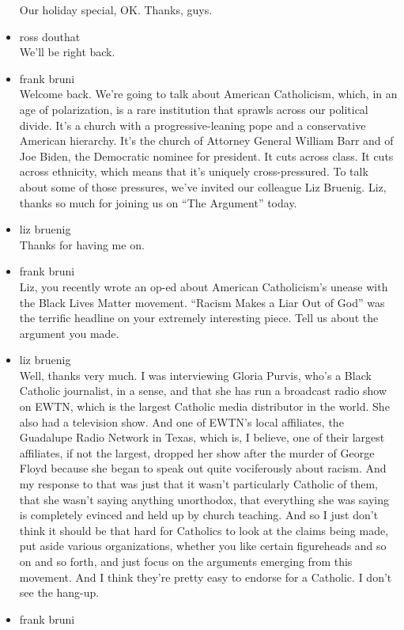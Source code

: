 \begin{itemize}
  Our holiday special, OK. Thanks, guys.
\item
  ross douthat\\
  We'll be right back.
\item
  frank bruni\\
  Welcome back. We're going to talk about American Catholicism, which,
  in an age of polarization, is a rare institution that sprawls across
  our political divide. It's a church with a progressive-leaning pope
  and a conservative American hierarchy. It's the church of Attorney
  General William Barr and of Joe Biden, the Democratic nominee for
  president. It cuts across class. It cuts across ethnicity, which means
  that it's uniquely cross-pressured. To talk about some of those
  pressures, we've invited our colleague Liz Bruenig. Liz, thanks so
  much for joining us on ``The Argument'' today.
\item
  liz bruenig\\
  Thanks for having me on.
\item
  frank bruni\\
  Liz, you recently wrote an op-ed about American Catholicism's unease
  with the Black Lives Matter movement. ``Racism Makes a Liar Out of
  God'' was the terrific headline on your extremely interesting piece.
  Tell us about the argument you made.
\item
  liz bruenig\\
  Well, thanks very much. I was interviewing Gloria Purvis, who's a
  Black Catholic journalist, in a sense, and that she has run a
  broadcast radio show on EWTN, which is the largest Catholic media
  distributor in the world. She also had a television show. And one of
  EWTN's local affiliates, the Guadalupe Radio Network in Texas, which
  is, I believe, one of their largest affiliates, if not the largest,
  dropped her show after the murder of George Floyd because she began to
  speak out quite vociferously about racism. And my response to that was
  just that it wasn't particularly Catholic of them, that she wasn't
  saying anything unorthodox, that everything she was saying is
  completely evinced and held up by church teaching. And so I just don't
  think it should be that hard for Catholics to look at the claims being
  made, put aside various organizations, whether you like certain
  figureheads and so on and so forth, and just focus on the arguments
  emerging from this movement. And I think they're pretty easy to
  endorse for a Catholic. I don't see the hang-up.
\item
  frank bruni\\

\end{itemize}
